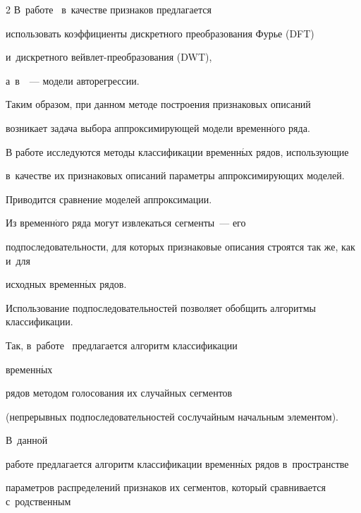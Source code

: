 \begin{multicols}{2}
В~работе~\cite{morchen2003time} в~качестве признаков предлагается 


использовать коэффициенты дискретного преобразования Фурье (DFT) 


и~дискретного вейв\-лет-пре\-обра\-зо\-ва\-ния (DWT), 


а~в~\cite{kini2013large, kuznetsov2015description}~--- модели авторегрессии.




Таким образом, при данном методе построения признаковых описаний 


возникает задача выбора аппроксимирующей модели временн$\acute{\mbox{о}}$го ряда.







В работе исследуются методы классификации временн$\acute{\mbox{ы}}$х рядов, использующие 


в~качестве их признаковых описаний параметры аппроксимирующих моделей.


Приводится сравнение моделей аппроксимации.


Из временн$\acute{\mbox{о}}$го ряда могут извлекаться сегменты~--- его 


подпоследовательности, для которых признаковые описания строятся так же, как и~для 


исходных временн$\acute{\mbox{ы}}$х рядов.


Использование подпоследовательностей позволяет обобщить алгоритмы классификации.


 Так, в~работе~\cite{geurts2005segment} предлагается алгоритм классификации 


 временн$\acute{\mbox{ы}}$х\linebreak


  рядов методом голосования их случайных сегментов 


 (непрерывных подпоследовательностей со\linebreak случайным начальным элементом).


В~данной\linebreak


 работе предлагается алгоритм классификации вре\-мен\-н$\acute{\mbox{ы}}$х рядов в~пространстве 


параметров распределений признаков их сегментов, который сравнивается с~родственным 



\end{multicols}
